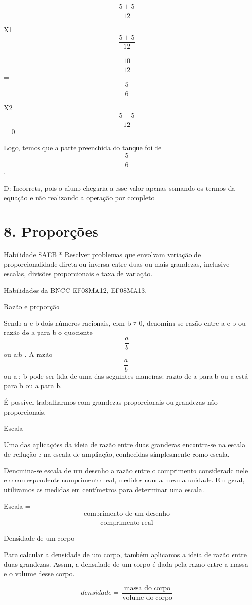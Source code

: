 \[\frac{5 \pm 5}{12}\]

X1 = \[\frac{5 + 5}{12}\] = \[\frac{10}{12}\] = \[\frac{5}{6}\]

X2 = \[\frac{5 - 5}{12}\] = 0

Logo, temos que a parte preenchida do tanque foi de \[\frac{5}{6}\].

D: Incorreta, pois o aluno chegaria a esse valor apenas somando os
termos da equação e não realizando a operação por completo.

\hypertarget{proporuxe7uxf5es}{%
\section{8. Proporções}\label{proporuxe7uxf5es}}

Habilidade SAEB * Resolver problemas que envolvam variação de
proporcionalidade direta ou inversa entre duas ou mais grandezas,
inclusive escalas, divisões proporcionais e taxa de variação.

Habilidades da BNCC EF08MA12, EF08MA13.

Razão e proporção

Sendo a e b dois números racionais, com b ≠ 0, denomina-se razão entre a
e b ou razão de a para b o quociente \[\frac{a}{b}\] ou a:b . A razão
\[\frac{a}{b}\ \] ou a : b pode ser lida de uma das seguintes maneiras:
razão de a para b ou a está para b ou a para b.

É possível trabalharmos com grandezas proporcionais ou grandezas não
proporcionais.

Escala

Uma das aplicações da ideia de razão entre duas grandezas encontra-se na
escala de redução e na escala de ampliação, conhecidas simplesmente como
escala.

Denomina-se escala de um desenho a razão entre o comprimento considerado
nele e o correspondente comprimento real, medidos com a mesma unidade.
Em geral, utilizamos as medidas em centímetros para determinar uma
escala.

Escala =
\[\frac{\text{comprimento\ de\ um\ desenho}}{\text{comprimento\ real}}\]

Densidade de um corpo

Para calcular a densidade de um corpo, também aplicamos a ideia de razão
entre duas grandezas. Assim, a densidade de um corpo é dada pela razão
entre a massa e o volume desse corpo.

\[densidade = \ \frac{\text{massa\ do\ corpo}}{\text{volume\ do\ corpo}}\]

